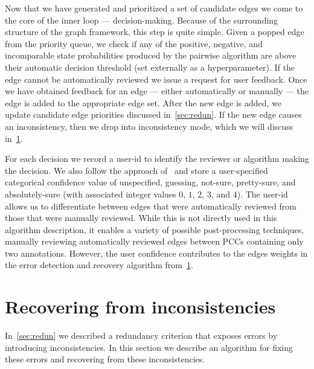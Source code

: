 Now that we have generated and prioritized a set of candidate edges we come to the core of the inner loop ---
  decision-making.
Because of the surrounding structure of the graph framework, this step is quite simple.
Given a popped edge from the priority queue, we check if any of the positive, negative, and incomparable state
  probabilities produced by the pairwise algorithm are above their automatic decision threshold (set externally as
  a hyperparameter).
If the edge cannot be automatically reviewed we issue a request for user feedback.
Once we have obtained feedback for an edge --- either automatically or manually --- the edge is added to the
  appropriate edge set.
After the new edge is added, we update candidate edge priorities discussed in~\cref{sec:redun}.
If the new edge causes an inconsistency, then we drop into inconsistency mode, which we will discuss
  in~\cref{sec:incon}.

For each decision we record a user-id to identify the reviewer or algorithm making the decision.
We also follow the approach of~\cite{branson_visual_2010} and store a user-specified categorical confidence value
  of unspecified, guessing, not-sure, pretty-sure, and absolutely-sure (with associated integer values $0$, $1$,
  $2$, $3$, and $4$).
The user-id allows us to differentiate between edges that were automatically reviewed from those that were
  manually reviewed.
While this is not directly used in this algorithm description, it enables a variety of possible post-processing
  techniques, \eg{} manually reviewing automatically reviewed edges between PCCs containing only two annotations.
However, the user confidence contributes to the edges weights in the error detection and recovery algorithm
  from~\cref{sec:incon}.


\section{Recovering from inconsistencies}\label{sec:incon}

In~\cref{sec:redun} we described a redundancy criterion that exposes errors by introducing inconsistencies.
In this section we describe an algorithm for fixing these errors and recovering from these inconsistencies.

